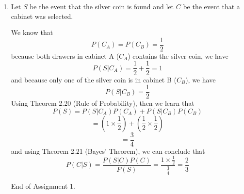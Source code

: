 \documentclass[12pt]{article}
\begin{document}
\begin{enumerate}
\begin{proof}
	We will now substitute $(\triangle)$ into $(\Theta)$  where we will have
	$$P(A^{c} \cap B) = P(B) - P(A)P(B)$$
	$$P(A^{c} \cap B) = P(B)(1 - P(A)) \qquad (\vert)$$
	and by Theorem 2.19 (Complement Rule), we learn that
	$$(1 - P(A)) = P(A^{c})$$
	then this equation,
	$$P(A^{c} \cap B) = P(A^{c})P(B)$$
	is identical to $(\vert)$. Hence we have proven that 
	
	$$A \text{ and } B \text{ are independent } \Rightarrow A^{c} \text{ and } B \text{ are independent.}$$ 

	``$\Leftarrow$": Now, since $A^c$ and $B$ are independent, we have:
	$$P(A^c \cap B) = P(A^c)P(B) \qquad (\phi)$$ 
	by Definition 2.18 (independence). This proof is trivial as it follows the same structure as the last one I did.
	Now we want to show that:
	$$P(A \cap B) = P(A)P(B)$$
	We know that:
	$$P(B) = P(A^{c} \cap B) + P(A \cap B) \qquad (\gamma)$$ 
	because the probability of $B$, is the same as probability of $A$ and $B$ happening added with probability of $\neg A$ and $B$. We then also learn that:
	$$P(A \cap B) = P(B) - P(A^c \cap B) \qquad (\Gamma)$$
	by rearranging $(\gamma)$. 
	
	We will now substitute $(\phi)$ into $(\gamma)$  where we will have
	$$P(A \cap B) = P(B) - P(A^c)P(B)$$
	$$P(A \cap B) = P(B)(1 - P(A^c)) \qquad (\psi)$$
	and by Theorem 2.19 (Complement Rule), we learn that
	$$(1 - P(A^c)) = P(A)$$
	then this equation,
	$$P(A \cap B) = P(A)P(B)$$
	is identical to $(\psi)$. Hence we have proven that 
	$$A^{c} \text{ and } B \text{ are independent } \Rightarrow A \text{ and } B \text{ are independent.} $$ 
	Therefore, We have proven that $A$ and $B$ are independent $\Leftrightarrow$ $A^c$ and $B$ are independent. \qedhere 
	\end{proof}
	
	\item Let $S$ be the event that the silver coin is found and let $C$ be the event that a cabinet was selected.

	We know that
	$$P(C_A) = P(C_B) = \frac{1}{2}$$
	because both drawers in cabinet A ($C_A$) contains the silver coin, we have 
	$$P(S|C_A) = \frac{1}{2} + \frac{1}{2} = 1$$
	and because only one of the silver coin is in cabinet B ($C_B$), we have
	$$P(S|C_B) = \frac{1}{2}$$
	Using Theorem 2.20 (Rule of Probability), then we learn that 
	$$P(S) = P(S|C_A)P(C_A) + P(S|C_B)P(C_B)$$
	$$= (1 \times \frac{1}{2}) + (\frac{1}{2} \times \frac{1}{2})$$
	$$= \frac{3}{4}$$
	and using Theorem 2.21 (Bayes' Theorem), we can conclude that
	$$P(C|S) = \frac{P(S|C)P(C)}{P(S)} = \frac{1 \times \frac{1}{2}}{\frac{3}{4}} = \frac{2}{3}$$
	
	End of Assignment 1.
	
	
	
	
	
	
	
\end{enumerate}
\end{document}
